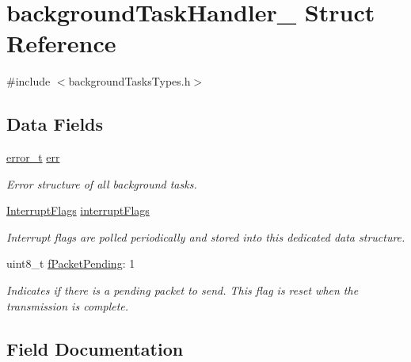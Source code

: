 \hypertarget{structbackground_task_handler__}{}\section{background\+Task\+Handler\+\_\+ Struct Reference}
\label{structbackground_task_handler__}


{\ttfamily \#include $<$background\+Tasks\+Types.\+h$>$}

\subsection*{Data Fields}
\begin{DoxyCompactItemize}
\item 
\mbox{\hyperlink{group__error_gad3ae44be85fe6952dcaed425499e8f6b}{error\+\_\+t}} \mbox{\hyperlink{structbackground_task_handler___a79e8f977787d9fccf257bbbccaaf3522}{err}}
\begin{DoxyCompactList}\small\item\em Error structure of all background tasks. \end{DoxyCompactList}\item 
\mbox{\hyperlink{group__interrupts_gab9c62f51454f2263c8f306c48ffc323b}{Interrupt\+Flags}} \mbox{\hyperlink{structbackground_task_handler___a52d2441cebb4150e2a4048da6eec1049}{interrupt\+Flags}}
\begin{DoxyCompactList}\small\item\em Interrupt flags are polled periodically and stored into this dedicated data structure. \end{DoxyCompactList}\item 
uint8\+\_\+t \mbox{\hyperlink{structbackground_task_handler___a55a5ad03a1e3f5808b419c49021b4759}{f\+Packet\+Pending}}\+: 1
\begin{DoxyCompactList}\small\item\em Indicates if there is a pending packet to send. This flag is reset when the transmission is complete. \end{DoxyCompactList}\end{DoxyCompactItemize}


\subsection{Field Documentation}
\mbox{\label{structbackground_task_handler___a79e8f977787d9fccf257bbbccaaf3522}} 
